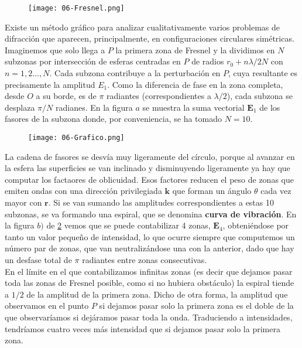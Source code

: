 \documentclass[12pt,a4paper]{book}
\numberwithin{equation}{section}
\numberwithin{figure}{section}
\newcommand{\1}{_{(1)}}
\newcommand{\2}{_{(2)}}
\newcommand{\rn}{\mathbf{r}}
\newcommand{\kn}{\mathbf{k}}
\newcommand{\En}{\mathbf{E}}
\theoremstyle{definition}
\begin{document}
\begin{figure}[h!]
    \centering
    \texttt{[image: 06-Fresnel.png]}
    \caption{}
    \label{Fig:06.2-01}
\end{figure}

Existe un método gráfico para analizar cualitativamente varios problemas de difracción que aparecen, principalmente, en configuraciones circulares simétricas. Imaginemos que solo llega a $P$ la primera zona de Fresnel y la dividimos en $N$ subzonas por intersección de esferas centradas en $P$ de radios $r_0+n\lambda /2N$ con $n=1,2 \ldots ,N$. Cada subzona contribuye a la perturbación en $P$, cuya resultante es precisamente la amplitud $E_1$. Como la diferencia de fase en la zona completa, desde $O$ a su borde, es de $\pi$ radiantes (correspondientes a $\lambda /2$), cada subzona se desplaza $\pi /N$ radianes. En la figura $a$  se muestra la suma vectorial $\En_1$ de los fasores de la subzona donde, por conveniencia, se ha tomado $N=10$. \\

\begin{figure}[h!]
    \centering
    \texttt{[image: 06-Grafico.png]}
    \caption{}
    \label{Fig:06.2-02}
\end{figure}

La cadena de fasores se desvía muy ligeramente del círculo, porque al avanzar en la esfera las superficies se van inclinado y disminuyendo ligeramente ya hay que computar los factaores de oblicuidad. Esos factores reducen el peso de zonas que emiten ondas con una dirección privilegiada $\kn$ que forman un ángulo $\theta$ cada vez mayor con $\rn$. Si se van sumando las amplitudes correspondientes a estas 10 subzonas, se va formando una espiral, que se denomina \textbf{curva de vibración}. En la figura $b)$ de \ref{Fig:06.2-02} vemos que se puede contabilizar 4 zonas, $\En_4$, obteniéndose por tanto un valor pequeño de intensidad, lo que ocurre siempre que computemos un número par de zonas, que van neutralizándose una con la anterior, dado que hay un desfase total de $\pi$ radiantes entre zonas consecutivas. \\

En el límite en el que contabilizamos infinitas zonas (es decir que dejamos pasar toda las zonas de Fresnel posible, como si no hubiera obstáculo) la espiral tiende a $1/2$ de la amplitud de la primera zona. Dicho de otra forma, la amplitud que observamos en el punto $P$ si dejamos pasar solo la primera zona es el doble de la que observaríamos si dejáramos pasar toda la onda. Traduciendo a intensidades, tendríamos cuatro veces más intensidad que si dejamos pasar solo la primera zona.  \\
\end{document}
